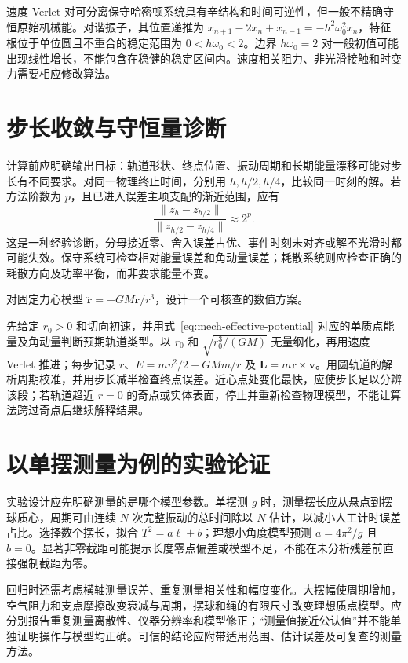 \documentclass[UTF8,12pt,a4paper,fontset=fandol]{ctexbook}
\begin{document}
速度 Verlet 对可分离保守哈密顿系统具有辛结构和时间可逆性，但一般不精确守恒原始机械能。对谐振子，其位置递推为 $x_{n+1}-2x_n+x_{n-1}=-h^2\omega_0^2x_n$，特征根位于单位圆且不重合的稳定范围为 $0<h\omega_0<2$。边界 $h\omega_0=2$ 对一般初值可能出现线性增长，不能包含在稳健的稳定区间内。速度相关阻力、非光滑接触和时变力需要相应修改算法。

\section{步长收敛与守恒量诊断}
计算前应明确输出目标：轨道形状、终点位置、振动周期和长期能量漂移可能对步长有不同要求。对同一物理终止时间，分别用 $h,h/2,h/4$，比较同一时刻的解。若方法阶数为 $p$，且已进入误差主项支配的渐近范围，应有
\[
 \frac{\|z_h-z_{h/2}\|}{\|z_{h/2}-z_{h/4}\|}\approx2^p.
\]
这是一种经验诊断，分母接近零、舍入误差占优、事件时刻未对齐或解不光滑时都可能失效。保守系统可检查相对能量误差和角动量误差；耗散系统则应检查正确的耗散方向及功率平衡，而非要求能量不变。

\begin{example}[引力轨道的计算方案]
对固定力心模型 $\ddot{\mathbf r}=-GM\mathbf r/r^3$，设计一个可核查的数值方案。
\end{example}
\begin{solve}
先给定 $r_0>0$ 和切向初速，并用式~\eqref{eq:mech-effective-potential} 对应的单质点能量及角动量判断预期轨道类型。以 $r_0$ 和 $\sqrt{r_0^3/(GM)}$ 无量纲化，再用速度 Verlet 推进；每步记录 $r$、$E=mv^2/2-GMm/r$ 及 $\mathbf L=m\mathbf r\times\mathbf v$。用圆轨道的解析周期校准，并用步长减半检查终点误差。近心点处变化最快，应使步长足以分辨该段；若轨道趋近 $r=0$ 的奇点或实体表面，停止并重新检查物理模型，不能让算法跨过奇点后继续解释结果。
\end{solve}

\section{以单摆测量为例的实验论证}
实验设计应先明确测量的是哪个模型参数。单摆测 $g$ 时，测量摆长应从悬点到摆球质心，周期可由连续 $N$ 次完整振动的总时间除以 $N$ 估计，以减小人工计时误差占比。选择数个摆长，拟合 $T^2=a\ell+b$；理想小角度模型预测 $a=4\pi^2/g$ 且 $b=0$。显著非零截距可能提示长度零点偏差或模型不足，不能在未分析残差前直接强制截距为零。

回归时还需考虑横轴测量误差、重复测量相关性和幅度变化。大摆幅使周期增加，空气阻力和支点摩擦改变衰减与周期，摆球和绳的有限尺寸改变理想质点模型。应分别报告重复测量离散性、仪器分辨率和模型修正；“测量值接近公认值”并不能单独证明操作与模型均正确。可信的结论应附带适用范围、估计误差及可复查的测量方法。
\end{document}
